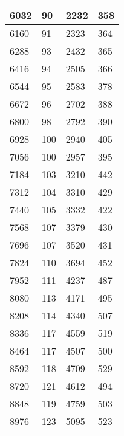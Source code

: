 \begin{longtable}{|l|l|l|l|}
		6032  & 90          & 2232            & 358              \\ \hline
		6160  & 91          & 2323            & 364              \\ \hline
		6288  & 93          & 2432            & 365              \\ \hline
		6416  & 94          & 2505            & 366              \\ \hline
		6544  & 95          & 2583            & 378              \\ \hline
		6672  & 96          & 2702            & 388              \\ \hline
		6800  & 98          & 2792            & 390              \\ \hline
		6928  & 100         & 2940            & 405              \\ \hline
		7056  & 100         & 2957            & 395              \\ \hline
		7184  & 103         & 3210            & 442              \\ \hline
		7312  & 104         & 3310            & 429              \\ \hline
		7440  & 105         & 3332            & 422              \\ \hline
		7568  & 107         & 3379            & 430              \\ \hline
		7696  & 107         & 3520            & 431              \\ \hline
		7824  & 110         & 3694            & 452              \\ \hline
		7952  & 111         & 4237            & 487              \\ \hline
		8080  & 113         & 4171            & 495              \\ \hline
		8208  & 114         & 4340            & 507              \\ \hline
		8336  & 117         & 4559            & 519              \\ \hline
		8464  & 117         & 4507            & 500              \\ \hline
		8592  & 118         & 4709            & 529              \\ \hline
		8720  & 121         & 4612            & 494              \\ \hline
		8848  & 119         & 4759            & 503              \\ \hline
		8976  & 123         & 5095            & 523              \\ \hline

\end{longtable}
